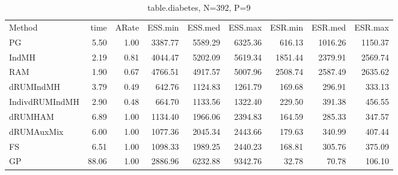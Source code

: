 \begin{table}
\begin{tabular}{l r r r r r r r r } 
          Method  &     time &    ARate &  ESS.min &  ESS.med &  ESS.max &  ESR.min &  ESR.med &  ESR.max \\ 
              PG  &     5.50 &     1.00 &  3387.77 &  5589.29 &  6325.36 &   616.13 &  1016.26 &  1150.37 \\ 
           IndMH  &     2.19 &     0.81 &  4044.47 &  5202.09 &  5619.34 &  1851.44 &  2379.91 &  2569.74 \\ 
             RAM  &     1.90 &     0.67 &  4766.51 &  4917.57 &  5007.96 &  2508.74 &  2587.49 &  2635.62 \\ 
       dRUMIndMH  &     3.79 &     0.49 &   642.76 &  1124.83 &  1261.79 &   169.68 &   296.91 &   333.13 \\ 
  IndivdRUMIndMH  &     2.90 &     0.48 &   664.70 &  1133.56 &  1322.40 &   229.50 &   391.38 &   456.55 \\ 
         dRUMHAM  &     6.89 &     1.00 &  1134.40 &  1966.06 &  2394.83 &   164.59 &   285.33 &   347.57 \\ 
      dRUMAuxMix  &     6.00 &     1.00 &  1077.36 &  2045.34 &  2443.66 &   179.63 &   340.99 &   407.44 \\ 
              FS  &     6.51 &     1.00 &  1098.33 &  1989.25 &  2440.23 &   168.81 &   305.76 &   375.09 \\ 
              GP  &    88.06 &     1.00 &  2886.96 &  6232.88 &  9342.76 &    32.78 &    70.78 &   106.10
 \end{tabular}
\caption{table.diabetes, N=392, P=9}
\end{table}


